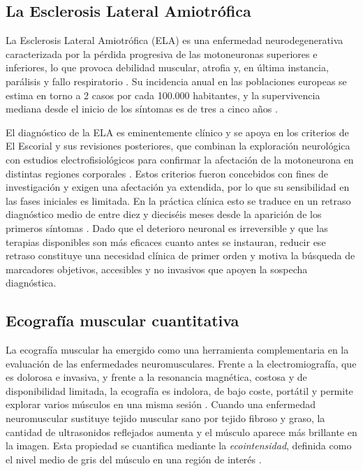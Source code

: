 \documentclass[12pt]{extarticle}
\numberwithin{equation}{section}
\begin{document}
\begin{refsection}
\subsection{La Esclerosis Lateral Amiotrófica}\label{subsec:ela}

La Esclerosis Lateral Amiotrófica (ELA) es una enfermedad neurodegenerativa caracterizada por la pérdida progresiva de las motoneuronas superiores e inferiores, lo que provoca debilidad muscular, atrofia y, en última instancia, parálisis y fallo respiratorio \cite{brown2017als,hardiman2017als}. Su incidencia anual en las poblaciones europeas se estima en torno a 2 casos por cada 100.000 habitantes, y la supervivencia mediana desde el inicio de los síntomas es de tres a cinco años \cite{logroscino2010incidence,hardiman2017als}.

El diagnóstico de la ELA es eminentemente clínico y se apoya en los criterios de El Escorial y sus revisiones posteriores, que combinan la exploración neurológica con estudios electrofisiológicos para confirmar la afectación de la motoneurona en distintas regiones corporales \cite{brooks2000escorial}. Estos criterios fueron concebidos con fines de investigación y exigen una afectación ya extendida, por lo que su sensibilidad en las fases iniciales es limitada. En la práctica clínica esto se traduce en un retraso diagnóstico medio de entre diez y dieciséis meses desde la aparición de los primeros síntomas \cite{hardiman2017als}. Dado que el deterioro neuronal es irreversible y que las terapias disponibles son más eficaces cuanto antes se instauran, reducir ese retraso constituye una necesidad clínica de primer orden y motiva la búsqueda de marcadores objetivos, accesibles y no invasivos que apoyen la sospecha diagnóstica.

\subsection{Ecografía muscular cuantitativa}\label{subsec:ecografia}

La ecografía muscular ha emergido como una herramienta complementaria en la evaluación de las enfermedades neuromusculares. Frente a la electromiografía, que es dolorosa e invasiva, y frente a la resonancia magnética, costosa y de disponibilidad limitada, la ecografía es indolora, de bajo coste, portátil y permite explorar varios músculos en una misma sesión \cite{pillen2008muscle}. Cuando una enfermedad neuromuscular sustituye tejido muscular sano por tejido fibroso y graso, la cantidad de ultrasonidos reflejados aumenta y el músculo aparece más brillante en la imagen. Esta propiedad se cuantifica mediante la \textit{ecointensidad}, definida como el nivel medio de gris del músculo en una región de interés \cite{pillen2008muscle,arts2010normal}.


\end{refsection}
\end{document}
